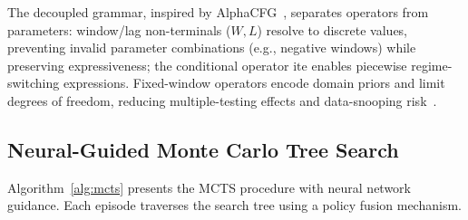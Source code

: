 The decoupled grammar, inspired by AlphaCFG~\cite{yang2026alpha}, separates operators from parameters: window/lag non-terminals ($\mathit{W}, \mathit{L}$) resolve to discrete values, preventing invalid parameter combinations (e.g., negative windows) while preserving expressiveness; the conditional operator $\text{ite}$ enables piecewise regime-switching expressions. Fixed-window operators encode domain priors and limit degrees of freedom, reducing multiple-testing effects and data-snooping risk~\cite{bailey2014deflated_sharpe}.

\subsection{Neural-Guided Monte Carlo Tree Search}
\label{subsec:mcts}

Algorithm~\ref{alg:mcts} presents the MCTS procedure with neural network guidance. Each episode traverses the search tree using a policy fusion mechanism.

